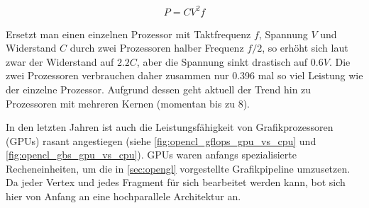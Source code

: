 \begin{align}
P = C V^2 f
\end{align}

Ersetzt man einen einzelnen Prozessor mit Taktfrequenz $f$, Spannung
$V$ und Widerstand $C$ durch zwei Prozessoren halber Frequenz $f/2$,
so erhöht sich laut \cite{Chandrakasan1995} zwar der Widerstand auf
$2.2C$, aber die Spannung sinkt drastisch auf $0.6V$. Die zwei
Prozessoren verbrauchen daher zusammen nur 0.396 mal so viel Leistung
wie der einzelne Prozessor. Aufgrund dessen geht aktuell der Trend hin
zu Prozessoren mit mehreren Kernen (momentan bis zu 8).

In den letzten Jahren ist auch die Leistungsfähigkeit von
Grafikprozessoren (GPUs) rasant angestiegen (siehe
\cref{fig:opencl_gflops_gpu_vs_cpu} und
\cref{fig:opencl_gbs_gpu_vs_cpu}). GPUs waren anfangs spezialisierte Recheneinheiten, um die in
\cref{sec:opengl} vorgestellte Grafikpipeline umzusetzen. Da jeder
Vertex und jedes Fragment für sich bearbeitet werden kann, bot sich
hier von Anfang an eine hochparallele Architektur an.

